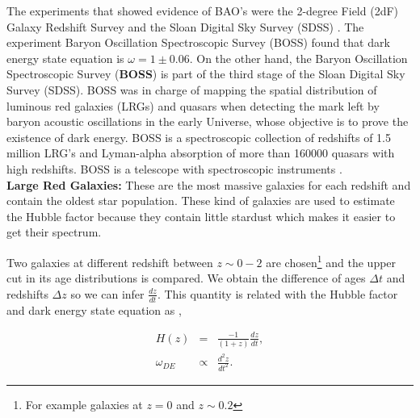 \documentclass[onecolumn,           %
               showpacs,            %
               preprintnumbers,     %
               aps,                 %
               letterpaper,             %
               superscriptaddress,      %
               nofootinbib,         %
               tightenlines,        %
               floats,floatfix      %
               ,usenatbib,
               ]{revtex4-1}
\begin{document}
The experiments that showed evidence of BAO's were the 2-degree Field (2dF) Galaxy Redshift Survey \cite{BAO3} and the Sloan Digital Sky Survey (SDSS) \cite{BAO4}. The experiment Baryon Oscillation Spectroscopic Survey (BOSS) found that dark energy state equation is $\omega = 1 \pm 0.06$. On the other hand, the Baryon Oscillation Spectroscopic Survey (\textbf{BOSS}) is part of the third stage of the Sloan Digital Sky Survey (SDSS). BOSS was in charge of mapping the spatial distribution of luminous red galaxies (LRGs) and quasars when detecting the mark left by baryon acoustic oscillations in the early Universe, whose objective is to prove the existence of dark energy. BOSS is a spectroscopic collection of redshifts of 1.5 million LRG's and Lyman-alpha absorption of more than 160000 quasars with high redshifts. BOSS is a telescope with spectroscopic instruments \cite{boss}.\\

\textbf{Large Red Galaxies:} These are the most massive galaxies for each redshift and contain the oldest star population. These kind of galaxies are used to estimate the Hubble factor because they contain little stardust which makes it easier to get their spectrum. 

Two galaxies at different redshift between $z \sim 0-2$ are chosen\footnote{For example galaxies at $z=0$ and $z \sim 0.2$} and the upper cut in its age distributions is compared. We obtain the difference of ages $\Delta t$ and redshifts $\Delta z$ so we can infer $\frac{dz}{dt}$. This quantity is related with the Hubble factor and dark energy state equation as \cite{H1}, \cite{H2}

\begin{eqnarray}
H(z) &=& \frac{-1}{(1+z)} \frac{dz}{dt},\\
\omega_{DE} &\propto& \frac{d^2z}{dt^2}.
\end{eqnarray}


\end{document}
